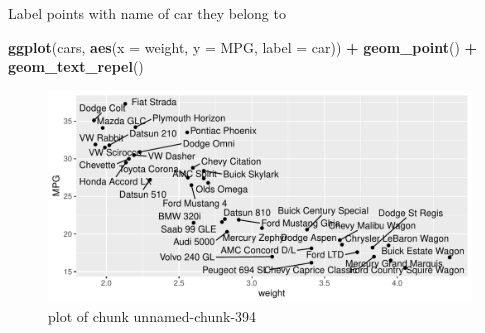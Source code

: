\documentclass[ignorenonframetext,]{beamer}
\newenvironment{Shaded}{\begin{snugshade}}{\end{snugshade}}
\newcommand{\DataTypeTok}[1]{\textcolor[rgb]{0.13,0.29,0.53}{#1}}
\newcommand{\KeywordTok}[1]{\textcolor[rgb]{0.13,0.29,0.53}{\textbf{#1}}}
\newcommand{\NormalTok}[1]{#1}
\newcommand{\OperatorTok}[1]{\textcolor[rgb]{0.81,0.36,0.00}{\textbf{#1}}}
\newcommand{\StringTok}[1]{\textcolor[rgb]{0.31,0.60,0.02}{#1}}
\begin{document}
\begin{frame}[fragile]{Label points with name of car they belong to}
\protect\hypertarget{label-points-with-name-of-car-they-belong-to}{}

\begin{Shaded}
\begin{Highlighting}[]
\KeywordTok{ggplot}\NormalTok{(cars, }\KeywordTok{aes}\NormalTok{(}\DataTypeTok{x =}\NormalTok{ weight, }\DataTypeTok{y =}\NormalTok{ MPG, }\DataTypeTok{label =}\NormalTok{ car)) }\OperatorTok{+}
\StringTok{  }\KeywordTok{geom_point}\NormalTok{() }\OperatorTok{+}\StringTok{ }\KeywordTok{geom_text_repel}\NormalTok{()}
\end{Highlighting}
\end{Shaded}

\begin{figure}
\centering
\includegraphics{figure/unnamed-chunk-394-1.pdf}
\caption{plot of chunk unnamed-chunk-394}
\end{figure}

\end{frame}
\end{document}
